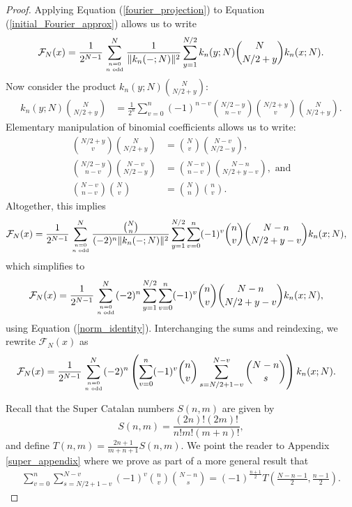 \documentclass{amsart}
\theoremstyle{plain}
\theoremstyle{remark}
\begin{document}
\begin{proof}
Applying Equation (\ref{fourier_projection}) to Equation (\ref{initial_Fourier_approx}) allows us to write
\begin{align}
\mathcal{F}_N(x) = \frac{1}{2^{N-1}} \sum_{n=0 \atop n \text{ odd}}^N \frac{1}{\| k_n(-;N)\|^2} \sum_{y=1}^{N/2} k_n(y;N)\binom{N}{N/2+y}k_n(x;N).
\end{align}
Now consider the product $k_n(y;N)\binom{N}{N/2+y}$:
\begin{align} \label{F12_identity}
k_n(y;N)\binom{N}{N/2+y} &= \frac{1}{2^n} \sum_{v=0}^{n} (-1)^{n-v} \binom{N/2-y}{n-v}\binom{N/2+y}{v}\binom{N}{N/2+y}.
\end{align}
Elementary manipulation of binomial coefficients allows us to write:
\begin{align*}
\binom{N/2+y}{v}\binom{N}{N/2+y} &= \binom{N}{v} \binom{N-v}{N/2-y},  \\
\binom{N/2-y}{n-v} \binom{N-v}{N/2-y} &= \binom{N-v}{n-v}\binom{N-n}{N/2+y-v}, \text{ and} \\
\binom{N-v}{n-v}\binom{N}{v} &= \binom{N}{n} \binom{n}{v}.
\end{align*}
Altogether, this implies
\begin{align*}
\mathcal{F}_N(x) &= \frac{1}{2^{N-1}} \sum_{n=0 \atop n\text{ odd}}^N \frac{\binom{N}{n}}{(-2)^n \|k_n(-;N)\|^2} \sum_{y=1}^{N/2} \sum_{v=0}^n (-1)^v \binom{n}{v} \binom{N-n}{N/2+y-v}k_n(x;N),
\end{align*}
which simplifies to
\begin{align*}
\mathcal{F}_N(x) &= \frac{1}{2^{N-1}} \sum_{n=0 \atop n\text{ odd}}^N (-2)^n \sum_{y=1}^{N/2} \sum_{v=0}^n (-1)^v \binom{n}{v} \binom{N-n}{N/2+y-v}k_n(x;N),
\end{align*}
using Equation (\ref{norm_identity}).  Interchanging the sums and reindexing, we rewrite $\mathcal{F}_N(x)$ as
\begin{align*}
\mathcal{F}_N(x) &= \frac{1}{2^{N-1}} \sum_{n=0 \atop n\text{ odd}}^N (-2)^n \left(\sum_{v=0}^{n} (-1)^v \binom{n}{v} \sum_{s=N/2+1-v}^{N-v} \binom{N-n}{s} \right)k_n(x;N).
\end{align*}

Recall that the Super Catalan numbers $S(n,m)$ are given by 
\[
S(n,m) = \frac{(2n)!(2m)!}{n!m!(m+n)!},
\]
and define $T(n,m) = \frac{2n+1}{m+n+1} S(n,m)$.  We point the reader to Appendix \ref{super_appendix} where we prove as part of a more general result that 
\begin{align} \label{super_identity_in_theorem}
\sum_{v=0}^n \sum_{s=N/2+1-v}^{N-v} (-1)^v\binom{n}{v}\binom{N-n}{s} = (-1)^{\frac{n+1}{2}}T\left( \frac{N-n-1}{2},\frac{n-1}{2}\right).
\end{align}


\end{proof}
\end{document}
